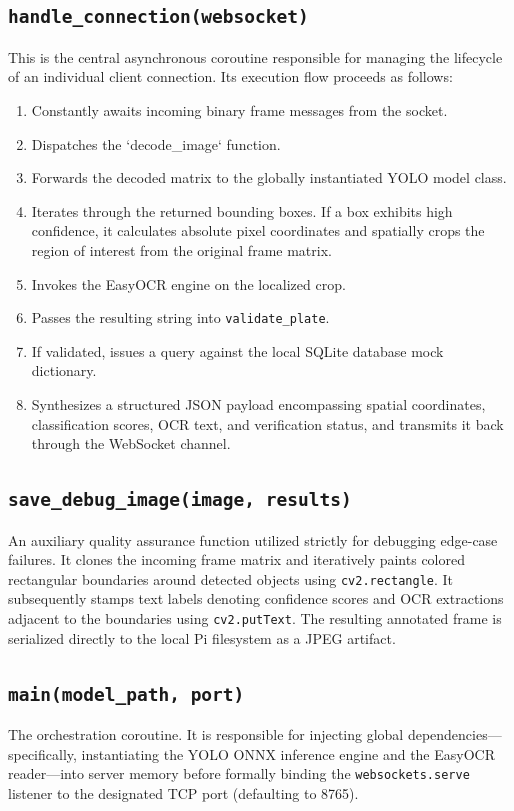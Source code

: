 \subsection{\texttt{handle\_connection(websocket)}}
This is the central asynchronous coroutine responsible for managing the lifecycle of an individual client connection. Its execution flow proceeds as follows:
\begin{enumerate}
    \item Constantly awaits incoming binary frame messages from the socket.
    \item Dispatches the `decode\_image` function.
    \item Forwards the decoded matrix to the globally instantiated YOLO model class.
    \item Iterates through the returned bounding boxes. If a box exhibits high confidence, it calculates absolute pixel coordinates and spatially crops the region of interest from the original frame matrix.
    \item Invokes the EasyOCR engine on the localized crop.
    \item Passes the resulting string into \texttt{validate\_plate}.
    \item If validated, issues a query against the local SQLite database mock dictionary. 
    \item Synthesizes a structured JSON payload encompassing spatial coordinates, classification scores, OCR text, and verification status, and transmits it back through the WebSocket channel.
\end{enumerate}

\subsection{\texttt{save\_debug\_image(image, results)}}
An auxiliary quality assurance function utilized strictly for debugging edge-case failures. It clones the incoming frame matrix and iteratively paints colored rectangular boundaries around detected objects using \texttt{cv2.rectangle}. It subsequently stamps text labels denoting confidence scores and OCR extractions adjacent to the boundaries using \texttt{cv2.putText}. The resulting annotated frame is serialized directly to the local Pi filesystem as a JPEG artifact.

\subsection{\texttt{main(model\_path, port)}}
The orchestration coroutine. It is responsible for injecting global dependencies---specifically, instantiating the YOLO ONNX inference engine and the EasyOCR reader---into server memory before formally binding the \texttt{websockets.serve} listener to the designated TCP port (defaulting to 8765).

